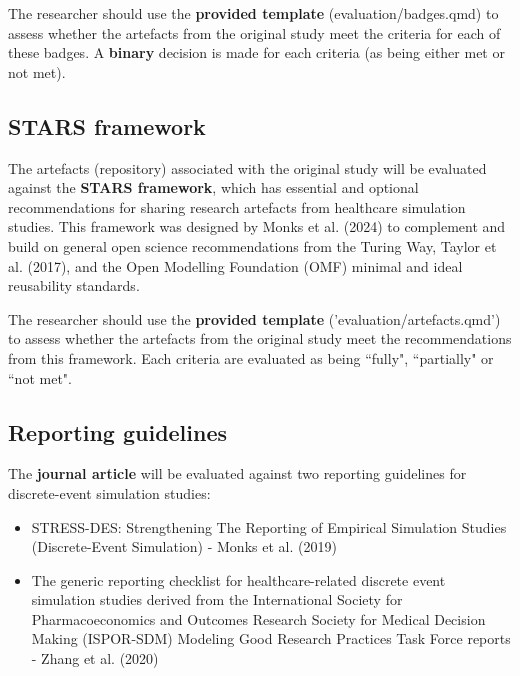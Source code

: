 The researcher should use the \textbf{provided template} (evaluation/badges.qmd) to assess whether the artefacts from the original study meet the criteria for each of these badges. A \textbf{binary} decision is made for each criteria (as being either met or not met).

\vspace{0.5cm}
\subsection{STARS framework}

The artefacts (repository) associated with the original study will be evaluated against the \textbf{STARS framework}, which has essential and optional recommendations for sharing research artefacts from healthcare simulation studies. This framework was designed by Monks et al. (2024)\autocite{monks_towards_2024} to complement and build on general open science recommendations from the Turing Way,\autocite{the_turing_way_community_turing_2022} Taylor et al. (2017),\autocite{taylor_open_2017} and the Open Modelling Foundation (OMF) minimal and ideal reusability standards.\autocite{the_open_modeling_foundation_omf_reusability_2024}

The researcher should use the \textbf{provided template} ('evaluation/artefacts.qmd') to assess whether the artefacts from the original study meet the recommendations from this framework. Each criteria are evaluated as being ``fully", ``partially" or ``not met".

\vspace{0.5cm}
\subsection{Reporting guidelines} \label{sec:reporting}

The \textbf{journal article} will be evaluated against two reporting guidelines for discrete-event simulation studies:
\begin{itemize}
    \item STRESS-DES: Strengthening The Reporting of Empirical Simulation Studies (Discrete-Event Simulation) - Monks et al. (2019)\autocite{monks_strengthening_2019}
    \item The generic reporting checklist for healthcare-related discrete event simulation studies derived from the International Society for Pharmacoeconomics and Outcomes Research Society for Medical Decision Making (ISPOR-SDM) Modeling Good Research Practices Task Force reports - Zhang et al. (2020)\autocite{zhang_reporting_2020}
\end{itemize}

